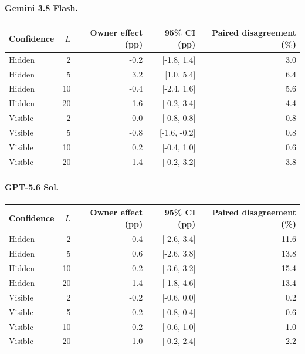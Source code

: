 \paragraph{Gemini 3.8 Flash.}
\begin{center}
\small
\begin{tabular}{lrrrr}
\toprule
Confidence & $L$ & Owner effect (pp) & 95\% CI (pp) & Paired disagreement (\%) \\
\midrule
Hidden & 2 & -0.2 & [-1.8, 1.4] & 3.0 \\
Hidden & 5 & 3.2 & [1.0, 5.4] & 6.4 \\
Hidden & 10 & -0.4 & [-2.4, 1.6] & 5.6 \\
Hidden & 20 & 1.6 & [-0.2, 3.4] & 4.4 \\
Visible & 2 & 0.0 & [-0.8, 0.8] & 0.8 \\
Visible & 5 & -0.8 & [-1.6, -0.2] & 0.8 \\
Visible & 10 & 0.2 & [-0.4, 1.0] & 0.6 \\
Visible & 20 & 1.4 & [-0.2, 3.2] & 3.8 \\
\bottomrule
\end{tabular}
\end{center}

\paragraph{GPT-5.6 Sol.}
\begin{center}
\small
\begin{tabular}{lrrrr}
\toprule
Confidence & $L$ & Owner effect (pp) & 95\% CI (pp) & Paired disagreement (\%) \\
\midrule
Hidden & 2 & 0.4 & [-2.6, 3.4] & 11.6 \\
Hidden & 5 & 0.6 & [-2.6, 3.8] & 13.8 \\
Hidden & 10 & -0.2 & [-3.6, 3.2] & 15.4 \\
Hidden & 20 & 1.4 & [-1.8, 4.6] & 13.4 \\
Visible & 2 & -0.2 & [-0.6, 0.0] & 0.2 \\
Visible & 5 & -0.2 & [-0.8, 0.4] & 0.6 \\
Visible & 10 & 0.2 & [-0.6, 1.0] & 1.0 \\
Visible & 20 & 1.0 & [-0.2, 2.4] & 2.2 \\
\bottomrule
\end{tabular}
\end{center}

